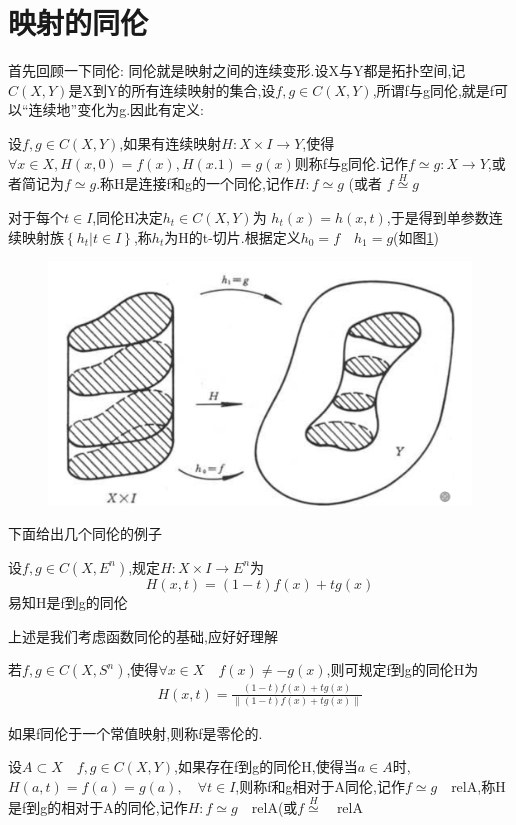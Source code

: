 \section{映射的同伦}
首先回顾一下同伦:
同伦就是映射之间的连续变形.设X与Y都是拓扑空间,记\(C(X,Y)\)是X到Y的所有连续映射的集合,设\(f,g \in C(X,Y)\),所谓f与g同伦,就是f可以“连续地”变化为g.因此有定义:
\begin{definition}
    设\(f ,g \in C(X,Y)\),如果有连续映射\(H: X \times I \rightarrow Y \),使得\(\forall x \in X , H(x,0) = f(x) , H(x.1) =g(x)\)则称f与g同伦.记作\(f \simeq g : X \rightarrow Y\),或者简记为\(f \simeq g\).称H是连接f和g的一个同伦,记作\(H: f \simeq g \) (或者 \(f \overset{H}{\simeq}g \) 
\end{definition}
对于每个\(t \in I \),同伦H决定\(h_t \in C (X,Y) \)为 \(h_t(x) = h(x,t)\),于是得到单参数连续映射族\(\left\{h_t | t \in I \right\}\),称\(h_t\)为H的t-切片.根据定义\(h_0 =f \quad h_1 = g\)(如图\ref{fig:enter-label_19})
\begin{figure}[H]
    \centering
    \includegraphics[width=0.5\linewidth]{image_19.png}
    \caption{}
    \label{fig:enter-label_19}
\end{figure}
下面给出几个同伦的例子
\begin{example}
    设\(f,g \in C(X,E^n)\),规定\(H: X \times I \rightarrow E^n\)为
    \[H(x,t) = (1-t) f(x) +tg(x)\]
    易知H是f到g的同伦
\end{example}
\begin{note}
    上述是我们考虑函数同伦的基础,应好好理解
\end{note}
\begin{example}
    若\(f,g \in C(X ,S^n)\),使得\(\forall x \in X  \quad f(x) \neq -g(x) \),则可规定f到g的同伦H为
    \begin{align}
        H(x,t) = \frac{(1-t)f(x) + tg(x)}{\parallel (1-t)f(x) + tg(x) \parallel }
    \end{align}
    
\end{example}
如果f同伦于一个常值映射,则称f是零伦的.
\begin{definition}
    设\(A \subset X \quad f,g \in C(X,Y)\),如果存在f到g的同伦H,使得当\(a \in A \)时,\(H(a,t)=f(a)=g(a) , \quad \forall t \in I \),则称f和g相对于A同伦,记作\(f \simeq g \quad \text{relA} \),称H是f到g的相对于A的同伦,记作\(H: f \simeq g \quad \text{relA}\)(或\(f \overset{H}{\simeq} \quad \text{relA}\)
\end{definition}
